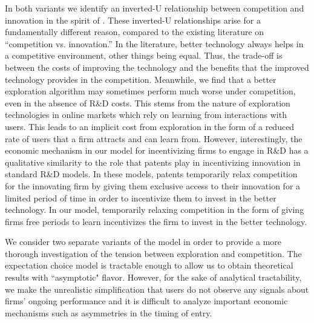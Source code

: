 In both variants we identify an inverted-U relationship between competition and innovation in the spirit of . These inverted-U relationships arise for a fundamentally different reason, compared to the existing literature on ``competition vs. innovation.'' In the literature, better technology always helps in a competitive environment, other things being equal. Thus, the trade-off is between the costs of improving the technology and the benefits that the improved technology provides in the competition. Meanwhile, we find that a better exploration algorithm may sometimes perform much worse under competition, even in the absence of R\&D costs. This stems from the nature of exploration technologies in online markets which rely on learning from interactions with users. This leads to an implicit cost from exploration in the form of a reduced rate of users that a firm attracts and can learn from. However, interestingly, the economic mechanism in our model for incentivizing firms to engage in R\&D has a qualitative similarity to the role that patents play in incentivizing innovation in standard R\&D models. In these models, patents temporarily relax competition for the innovating firm by giving them exclusive access to their innovation for a limited period of time in order to incentivize them to invest in the better technology. In our model, temporarily relaxing competition in the form of giving firms free periods to learn incentivizes the firm to invest in the better technology.

We consider two separate variants of the model in order to provide a more thorough investigation of the tension between exploration and competition. The expectation choice model is tractable enough to allow us to obtain theoretical results with ``asymptotic" flavor. However, for the sake of analytical tractability, we make the unrealistic simplification that users do not observe any signals about firms' ongoing performance and it is difficult to analyze important economic mechanisms such as asymmetries in the timing of entry.


